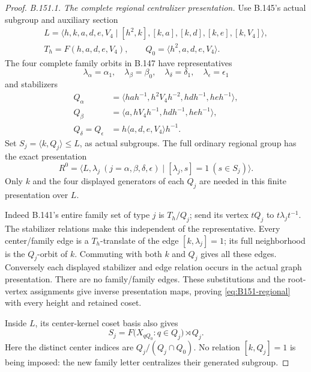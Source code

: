 \begin{proof}
\emph{B.151.1. The complete regional centralizer presentation.}
Use B.145's actual subgroup and auxiliary section
\begin{equation}\label{eq:B151-L}
\begin{gathered}
 L=\langle h,k,a,d,e,V_4\mid
 [h^2,k],[k,a],[k,d],[k,e],[k,V_4]\rangle,\\
 T_h=F(h,a,d,e,V_4),\qquad
 Q_0=\langle h^2,a,d,e,V_4\rangle.
\end{gathered}
\end{equation}
The four complete family orbits in B.147 have representatives
\[
 \lambda_\alpha=\alpha_1,\quad \lambda_\beta=\beta_0,\quad
 \lambda_\delta=\delta_1,\quad \lambda_\epsilon=\epsilon_1
\]
and stabilizers
\begin{equation}\label{eq:B151-stabilizers}
\begin{aligned}
 Q_\alpha&=\langle hah^{-1},h^2V_4h^{-2},hdh^{-1},heh^{-1}\rangle,\\
 Q_\beta&=\langle a,hV_4h^{-1},hdh^{-1},heh^{-1}\rangle,\\
 Q_\delta=Q_\epsilon&=h\langle a,d,e,V_4\rangle h^{-1}.
\end{aligned}
\end{equation}
Set \(S_j=\langle k,Q_j\rangle\le L\), as actual subgroups.
The full ordinary regional group has the exact presentation
\begin{equation}\label{eq:B151-regional}
 R^0=\langle L,\lambda_j\ (j=\alpha,\beta,\delta,\epsilon)
              \mid [\lambda_j,s]=1\ (s\in S_j)\rangle.
\end{equation}
Only \(k\) and the four displayed generators of each \(Q_j\)
are needed in this finite presentation over \(L\).

Indeed B.141's entire family set of type \(j\) is \(T_h/Q_j\);
send its vertex \(tQ_j\) to \(t\lambda_jt^{-1}\).
The stabilizer relations make this independent of the representative.
Every center/family edge is a \(T_h\)-translate of the edge
\([k,\lambda_j]=1\); its full neighborhood is the \(Q_j\)-orbit
of \(k\). Commuting with both \(k\) and \(Q_j\) gives all
these edges. Conversely each displayed stabilizer and edge
relation occurs in the actual graph presentation. There are no
family/family edges. These substitutions and the root-vertex
assignments give inverse presentation maps, proving
\eqref{eq:B151-regional} with every height and retained coset.

Inside \(L\), its center-kernel coset basis also gives
\[
 S_j=F\bigl(X_{qQ_0}:q\in Q_j\bigr)\rtimes Q_j.
\]
Here the distinct center indices are
\(Q_j/(Q_j\cap Q_0)\). No relation \([k,Q_j]=1\) is being
imposed: the new family letter centralizes their generated subgroup.


\end{proof}
